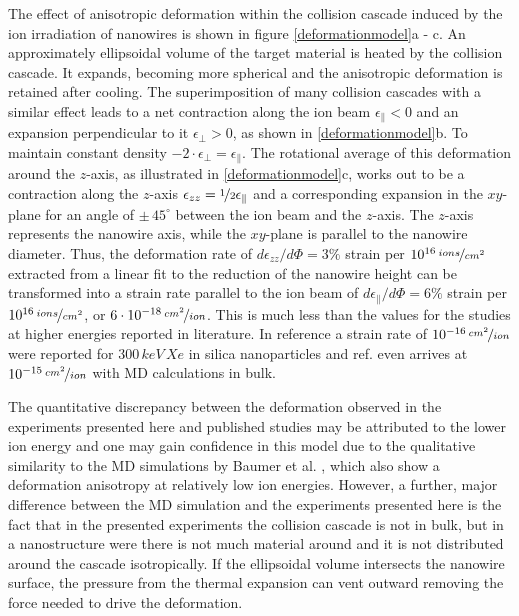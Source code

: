 The effect of anisotropic deformation within the collision cascade induced by the ion irradiation of nanowires is shown in figure \ref{deformationmodel}a - c. An approximately ellipsoidal volume of the target material is heated by the collision cascade. It expands, becoming more spherical and the anisotropic deformation is retained after cooling. The superimposition of many collision cascades with a similar effect leads to a net contraction along the ion beam $\epsilon_{\parallel} < 0$ and an expansion perpendicular to it $\epsilon_{\perp} > 0$, as shown in \ref{deformationmodel}b. To maintain constant density $-2\cdot\epsilon_{\perp} =  \epsilon_{\parallel}$. The rotational average of this deformation around the $z$-axis, as illustrated in \ref{deformationmodel}c, works out to be a contraction along the $z$-axis $\epsilon_{zz} = \nicefrac{1}{2} \epsilon_{\parallel}$ and a corresponding expansion in the $xy$-plane for an angle of $\pm\, 45^\circ$ between the ion beam and the $z$-axis. The $z$-axis represents the nanowire axis, while the $xy$-plane is parallel to the nanowire diameter. Thus, the deformation rate of $d\epsilon_{zz}/d\Phi = 3\%$ strain per $10^{16}\,\nicefrac{ions}{cm^2}$ extracted from a linear fit to the reduction of the nanowire height can be transformed into a strain rate parallel to the ion beam of $d\epsilon_{\parallel}/d\Phi = 6\%$ strain per $10^{16}\,\nicefrac{ions}{cm^2}$, or $6\cdot 10^{-18}\,\nicefrac{cm^2}{ion}$. This is much less than the values for the studies at higher energies reported in literature. In reference \cite{dillen_ion_2003} a strain rate of $10^{-16}\,\nicefrac{cm^2}{ion}$ were reported for $300\,keV\,Xe$ in silica nanoparticles and ref. \cite{baumer_prediction_2014} even arrives at $10^{-15}\,\nicefrac{cm^2}{ion}$ with MD calculations in bulk. 

The quantitative discrepancy between the deformation observed in the experiments presented here and published studies may be attributed to the lower ion energy and one may gain confidence in this model due to the qualitative similarity to the MD simulations by Baumer et al. \cite{baumer_prediction_2014}, which also show a deformation anisotropy at relatively low ion energies. However, a further, major difference between the MD simulation and the experiments presented here is the fact that in the presented experiments the collision cascade is not in bulk, but in a nanostructure were there is not much material around and it is not distributed around the cascade isotropically. If the ellipsoidal volume intersects the nanowire surface, the pressure from the thermal expansion can vent outward removing the force needed to drive the deformation.

